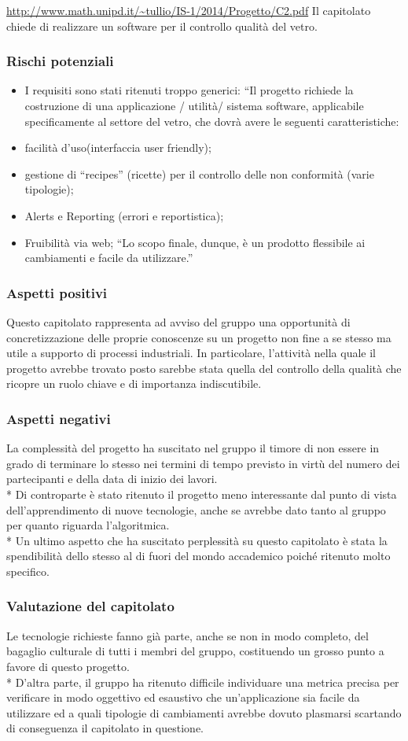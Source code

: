 \url{http://www.math.unipd.it/~tullio/IS-1/2014/Progetto/C2.pdf}
Il capitolato chiede di realizzare un software per il controllo qualità del vetro. 
\subsubsection{Rischi potenziali}
\begin{itemize}
	\item I requisiti sono stati ritenuti troppo generici:
	“Il progetto richiede la	costruzione di una applicazione	/ utilità/	sistema	software,	applicabile specificamente al settore del	vetro, che dovrà avere le seguenti caratteristiche: 
	\item facilità d’uso(interfaccia user friendly);
 	\item gestione di “recipes”	(ricette)  per il controllo delle non conformità (varie tipologie); 
	\item Alerts	e Reporting (errori e reportistica); 
	\item Fruibilità via web;
“Lo scopo finale, dunque,  è un	prodotto flessibile ai cambiamenti e facile da utilizzare.”
\end{itemize}
\subsubsection{Aspetti positivi}
Questo capitolato rappresenta ad avviso del gruppo una opportunità di concretizzazione delle proprie conoscenze su un progetto non fine a se stesso ma utile a supporto di processi industriali. In particolare, l’attività nella quale il progetto avrebbe trovato posto sarebbe stata quella del controllo della qualità che ricopre un ruolo chiave e di importanza indiscutibile.
\subsubsection{Aspetti negativi}
La complessità del progetto ha suscitato nel gruppo il timore di non essere in grado di terminare lo stesso nei termini di tempo previsto in virtù del numero dei partecipanti e della data di inizio dei lavori. \\*
Di controparte è stato ritenuto il progetto meno interessante dal punto di vista dell’apprendimento di nuove tecnologie, anche se avrebbe dato tanto al gruppo per quanto riguarda l’algoritmica.\\*
Un ultimo aspetto che ha suscitato perplessità su questo capitolato è stata la spendibilità dello stesso al di fuori del mondo accademico poiché ritenuto molto specifico.
\subsubsection{Valutazione del capitolato}
Le tecnologie richieste fanno già parte, anche se non in modo completo, del bagaglio culturale di tutti i membri del gruppo, costituendo un grosso punto a favore di questo progetto. \\*
D’altra parte, il gruppo ha ritenuto difficile individuare una metrica precisa per verificare in modo oggettivo ed esaustivo che un’applicazione sia facile da utilizzare ed a quali tipologie di cambiamenti avrebbe dovuto plasmarsi scartando di conseguenza il capitolato in questione.
